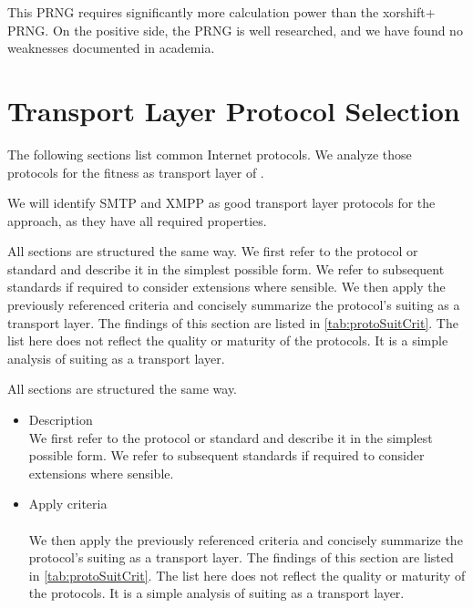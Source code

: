 This PRNG requires significantly more calculation power than the xorshift+ PRNG. On the positive side, the PRNG is well researched, and we have found no weaknesses documented in academia.


\section{Transport Layer Protocol Selection}\label{sec:transportProtocols}
The following sections list common Internet protocols. We analyze those protocols for the fitness as transport layer of \MessageVortex. 

We will identify SMTP and XMPP as good transport layer protocols for the \MessageVortex{} approach, as they have all required properties.

All sections are structured the same way. We first refer to the protocol or standard and describe it in the simplest possible form. We refer to subsequent standards if required to consider extensions where sensible. We then apply the previously referenced criteria and concisely summarize the protocol's suiting as a transport layer. The findings of this section are listed in \cref{tab:protoSuitCrit}. The list here does not reflect the quality or maturity of the protocols. It is a simple analysis of suiting as a transport layer.

All sections are structured the same way. 
\begin{itemize}
	\item Description\\
	We first refer to the protocol or standard and describe it in the simplest possible form. We refer to subsequent standards if required to consider extensions where sensible.
	\item Apply criteria\\\\
	We then apply the previously referenced criteria and concisely summarize the protocol's suiting as a transport layer. The findings of this section are listed in \cref{tab:protoSuitCrit}. The list here does not reflect the quality or maturity of the protocols. It is a simple analysis of suiting as a transport layer.
\end{itemize} 


